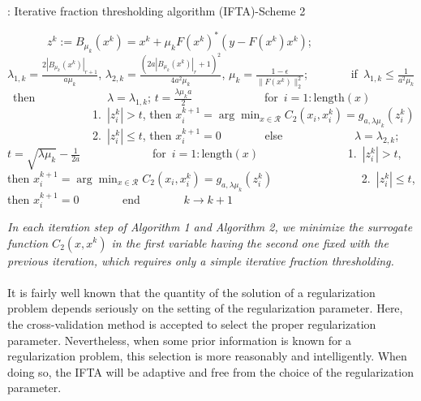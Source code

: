 \documentclass[smallextended]{svjour3}
\begin{document}
\begin{algorithm}[h!]
\caption{: Iterative fraction thresholding algorithm (IFTA)-Scheme 2}
\label{alg:A}
\begin{algorithmic}
\STATE \ \ \ \ \ \ \ {$z^{k}:=B_{\mu_{k}}(x^{k})=x^{k}+\mu_{k} F(x^{k})^{\ast}(y-F(x^{k})x^{k})$;}
\STATE \ \ \ \ \ \ \ {$\lambda_{1,k}=\frac{2|B_{\mu_{k}}(x^{k})|_{r+1}}{a\mu_{k}}$, $\lambda_{2,k}=\frac{(2a|B_{\mu_{k}}(x^{k})|_{r}+1)^{2}}{4a^{2}\mu_{k}}$, $\mu_{k}=\frac{1-\epsilon}{\|F(x^{k})\|_{2}^{2}}$;}
\STATE \ \ \ \ \ \ \ {if\ $\lambda_{1,k}\leq\frac{1}{a^{2}\mu_{k}}$\ then}
\STATE \ \ \ \ \ \ \ \ \ \ \ \ {$\lambda=\lambda_{1,k}$; $t=\frac{\lambda\mu_{k} a}{2}$}
\STATE \ \ \ \ \ \ \ \ \ \ \ \ {for\ $i=1:\mathrm{length}(x)$}
\STATE \ \ \ \ \ \ \ \ \ \ \ \ \ \ \ {1.\ $|z^{k}_{i}|>t$, then $x^{k+1}_{i}=\displaystyle\arg\min_{x\in \mathcal{R}}C_{2}(x_{i},x_{i}^{k})=g_{a,\lambda\mu_{k}}(z^{k}_{i})$}
\STATE \ \ \ \ \ \ \ \ \ \ \ \ \ \ \ {2.\ $|z^{k}_{i}|\leq t$, then $x^{k+1}_{i}=0$}
\STATE \ \ \ \ \ \ \ {else}
\STATE \ \ \ \ \ \ \ \ \ \ \ \ {$\lambda=\lambda_{2,k}$; $t=\sqrt{\lambda\mu_{k}}-\frac{1}{2a}$}
\STATE \ \ \ \ \ \ \ \ \ \ \ \ {for\ $i=1:\mathrm{length}(x)$}
\STATE \ \ \ \ \ \ \ \ \ \ \ \ \ \ \ {1.\ $|z^{k}_{i}|>t$, then $x^{k+1}_{i}=\displaystyle\arg\min_{x\in \mathcal{R}}C_{2}(x_{i},x_{i}^{k})=g_{a,\lambda\mu_{k}}(z^{k}_{i})$}
\STATE \ \ \ \ \ \ \ \ \ \ \ \ \ \ \ {2.\ $|z^{k}_{i}|\leq t$, then $x^{k+1}_{i}=0$}
\STATE \ \ \ \ \ \ \ {end}
\STATE \ \ \ \ \ \ \ {$k\rightarrow k+1$}
\end{algorithmic}
\end{algorithm}

\emph{In each iteration step of Algorithm 1 and Algorithm 2, we minimize the surrogate function $C_{2}(x,x^{k})$ in the first variable
having the second one fixed with the previous iteration, which requires only a simple iterative fraction thresholding.}\\\\

It is fairly well known that the quantity of the solution of a regularization problem depends seriously on the setting of the regularization
parameter. Here, the cross-validation method is accepted to select the proper regularization parameter. Nevertheless, when some prior information
is known for a regularization problem, this selection is more reasonably and intelligently. When doing so, the IFTA will be adaptive and free from
the choice of the regularization parameter.
\end{document}
